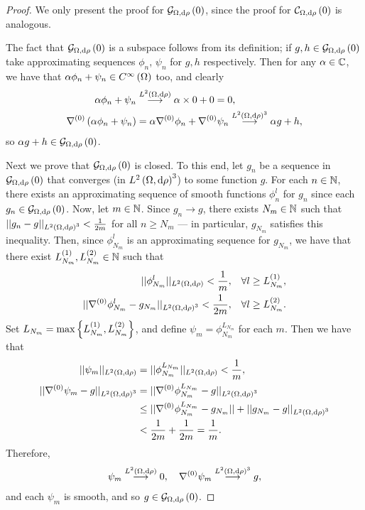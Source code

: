 \begin{proof}
	We only present the proof for $\mathcal{G}_{ \Omega, \mathrm{d}\rho}\left( 0 \right)$, since the proof for $\mathcal{C}_{ \Omega, \mathrm{d}\rho}\left( 0 \right)$ is analogous.
	
	The fact that $\mathcal{G}_{ \Omega, \mathrm{d}\rho}\left( 0 \right)$ is a subspace follows from its definition; if $g, h\in\mathcal{G}_{ \Omega, \mathrm{d}\rho}\left( 0 \right)$ take approximating sequences $\phi_n$, $\psi_n$ for $g,h$ respectively.
	Then for any $\alpha\in\mathbb{C}$, we have that $\alpha\phi_n + \psi_n\in C^{\infty}\left( \Omega \right)$ too, and clearly
	\begin{align*}
		\alpha\phi_n + \psi_n &\overset{L^{2}\left( \Omega,\mathrm{d}\rho \right)}{\longrightarrow} \alpha\times 0 + 0 = 0, \\
		\nabla^{(0)}\left( \alpha\phi_n + \psi_n \right) &= \alpha\nabla^{(0)}\phi_n + \nabla^{(0)}\psi_n
		\overset{L^{2}\left( \Omega,\mathrm{d}\rho \right)^3}{\longrightarrow} \alpha g + h,
	\end{align*}
	so $\alpha g + h\in\mathcal{G}_{ \Omega, \mathrm{d}\rho}\left( 0 \right)$.
	
	Next we prove that $\mathcal{G}_{ \Omega, \mathrm{d}\rho}\left( 0 \right)$ is closed.
	To this end, let $g_n$ be a sequence in $\mathcal{G}_{ \Omega, \mathrm{d}\rho}\left( 0 \right)$ that converges (in $L^{2}\left( \Omega,\mathrm{d}\rho \right)^3$) to some function $g$.
	For each $n\in\mathbb{N}$, there exists an approximating sequence of smooth functions $\phi_n^l$ for $g_n$ since each $g_n\in\mathcal{G}_{ \Omega, \mathrm{d}\rho}\left( 0 \right)$.
	Now, let $m\in\mathbb{N}$.
	Since $g_n\rightarrow g$, there exists $N_m\in\mathbb{N}$ such that $\lvert\lvert g_n-g \rvert\rvert_{L^{2}\left( \Omega,\mathrm{d}\rho \right)^3}<\frac{1}{2m}$ for all $n\geq N_m$ --- in particular, $g_{N_m}$ satisfies this inequality.
	Then, since $\phi_{N_m}^l$ is an approximating sequence for $g_{N_m}$, we have that there exist $L_{N_m}^{(1)}, L_{N_m}^{(2)}\in\mathbb{N}$ such that
	\begin{align*}
		\lvert\lvert \phi_{N_m}^l \rvert\rvert_{L^{2}\left( \Omega,\mathrm{d}\rho \right)} < \frac{1}{m}, &\quad\forall l\geq L_{N_m}^{(1)}, \\
		\lvert\lvert \nabla^{(0)}\phi_{N_m}^l - g_{N_m} \rvert\rvert_{L^{2}\left( \Omega,\mathrm{d}\rho \right)^3} < \frac{1}{2m}, &\quad\forall l\geq L_{N_m}^{(2)}.
	\end{align*}	 
	Set $L_{N_m} = \max\left\{  L_{N_m}^{(1)}, L_{N_m}^{(2)}  \right\}$, and define $\psi_m = \phi^{L_{N_m}}_{N_m}$ for each $m$.
	Then we have that
	\begin{align*}
		\lvert\lvert \psi_m \rvert\rvert_{L^{2}\left( \Omega,\mathrm{d}\rho \right)} &= \lvert\lvert \phi_{N_m}^{L_{N_m}} \rvert\rvert_{L^{2}\left( \Omega,\mathrm{d}\rho \right)} < \frac{1}{m}, \\
		\lvert\lvert \nabla^{(0)}\psi_m - g \rvert\rvert_{L^{2}\left( \Omega,\mathrm{d}\rho \right)^3} &= \lvert\lvert \nabla^{(0)}\phi_{N_m}^{L_{N_m}} - g \rvert\rvert_{L^{2}\left( \Omega,\mathrm{d}\rho \right)^3} \\
		&\leq \lvert\lvert \nabla^{(0)}\phi_{N_m}^{L_{N_m}} - g_{N_m} \rvert\rvert + \lvert\lvert g_{N_m} - g \rvert\rvert_{L^{2}\left( \Omega,\mathrm{d}\rho \right)^3} \\
		&< \frac{1}{2m} + \frac{1}{2m} = \frac{1}{m}.
	\end{align*}
	Therefore,
	\begin{align*}
		\psi_m \overset{L^{2}\left( \Omega,\mathrm{d}\rho \right)}{\longrightarrow} 0, \quad \nabla^{(0)}\psi_m \overset{L^{2}\left( \Omega,\mathrm{d}\rho \right)^3}{\longrightarrow} g,
	\end{align*}
	and each $\psi_m$ is smooth, and so $g\in\mathcal{G}_{ \Omega, \mathrm{d}\rho}\left( 0 \right)$.
\end{proof}

